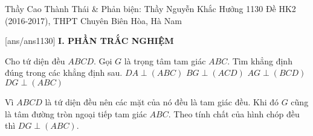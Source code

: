 \begin{name}
{Thầy Cao Thành Thái \& Phản biện: Thầy Nguyễn Khắc Hưởng}
{1130 Đề HK2 (2016-2017), THPT Chuyên Biên Hòa, Hà Nam}
    \end{name}
\setcounter{ex}{0}\setcounter{bt}{0}
[ans/ans1130]
\noindent\textbf{I. PHẦN TRẮC NGHIỆM}

\begin{ex}%
 Cho tứ diện đều $ABCD$. Gọi $G$ là trọng tâm tam giác $ABC$. Tìm khẳng định đúng trong các khẳng định sau.
 \choice
  {$DA \perp (ABC)$}
  {$BG \perp (ACD)$}
  {$AG \perp (BCD)$}
  {\True $DG \perp (ABC)$}
 \loigiai
  {
  \immini
  {
  Vì $ABCD$ là tứ diện đều nên các mặt của nó đều là tam giác đều. Khi đó $G$ cũng là tâm đường tròn ngoại tiếp tam giác $ABC$.
  Theo tính chất của hình chóp đều thì $DG \perp (ABC)$.
  }
  {
  }
  }
\end{ex}


